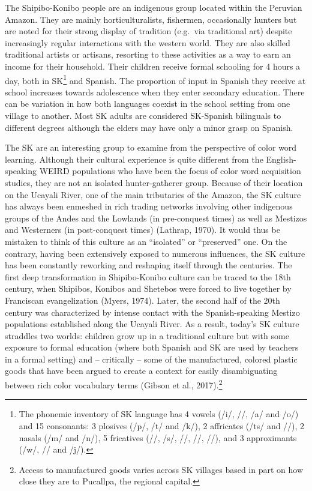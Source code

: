 \documentclass[
  ,apa7,floatsintext]{apa6}
\begin{document}
The Shipibo-Konibo people are an indigenous group located within the Peruvian Amazon. They are mainly horticulturalists, fishermen, occasionally hunters but are noted for their strong display of tradition (e.g.~via traditional art) despite increasingly regular interactions with the western world. They are also skilled traditional artists or artisans, resorting to these activities as a way to earn an income for their household. Their children receive formal schooling for 4 hours a day, both in SK\footnote{The phonemic inventory of SK language has 4 vowels (/i/, //, /a/ and /o/) and 15 consonants: 3 plosives (/p/, /t/ and /k/), 2 affricates (/ts/ and //), 2 nasals (/m/ and /n/), 5 fricatives (//, /s/, //, //, //), and 3 approximants (/w/, // and /j/).} and Spanish. The proportion of input in Spanish they receive at school increases towards adolescence when they enter secondary education. There can be variation in how both languages coexist in the school setting from one village to another. Most SK adults are considered SK-Spanish bilinguals to different degrees although the elders may have only a minor grasp on Spanish.

The SK are an interesting group to examine from the perspective of color word learning. Although their cultural experience is quite different from the English-speaking WEIRD populations who have been the focus of color word acquisition studies, they are not an isolated hunter-gatherer group. Because of their location on the Ucayali River, one of the main tributaries of the Amazon, the SK culture has always been enmeshed in rich trading networks involving other indigenous groups of the Andes and the Lowlands (in pre-conquest times) as well as Mestizos and Westerners (in post-conquest times) (Lathrap, 1970). It would thus be mistaken to think of this culture as an ``isolated'' or ``preserved'' one. On the contrary, having been extensively exposed to numerous influences, the SK culture has been constantly reworking and reshaping itself through the centuries. The first deep transformation in Shipibo-Konibo culture can be traced to the 18th century, when Shipibos, Konibos and Shetebos were forced to live together by Franciscan evangelization (Myers, 1974). Later, the second half of the 20th century was characterized by intense contact with the Spanish-speaking Mestizo populations established along the Ucayali River. As a result, today's SK culture straddles two worlds: children grow up in a traditional culture but with some exposure to formal education (where both Spanish and SK are used by teachers in a formal setting) and -- critically -- some of the manufactured, colored plastic goods that have been argued to create a context for easily disambiguating between rich color vocabulary terms (Gibson et al., 2017).\footnote{Access to manufactured goods varies across SK villages based in part on how close they are to Pucallpa, the regional capital.}
\end{document}
